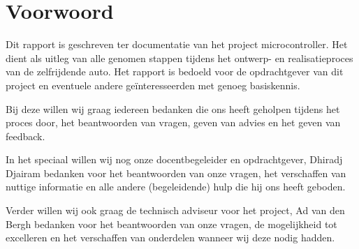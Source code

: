 \section{Voorwoord}
Dit rapport is geschreven ter documentatie van het project microcontroller. Het dient als uitleg van alle genomen stappen tijdens het ontwerp- en realisatieproces van de zelfrijdende auto.  Het rapport is bedoeld voor de opdrachtgever van dit project en eventuele andere geïnteresseerden met genoeg basiskennis. 

Bij deze willen wij graag iedereen bedanken die ons heeft geholpen tijdens het proces door, het beantwoorden van vragen, geven van advies en het geven van feedback. 

In het speciaal willen wij nog onze docentbegeleider en opdrachtgever, Dhiradj Djairam bedanken voor het beantwoorden van onze vragen, het verschaffen van nuttige informatie en alle andere (begeleidende) hulp die hij ons heeft geboden. 

Verder willen wij ook graag de technisch adviseur voor het project, Ad van den Bergh bedanken voor het beantwoorden van onze vragen, de mogelijkheid tot excelleren en het verschaffen van onderdelen wanneer wij deze nodig hadden. 
